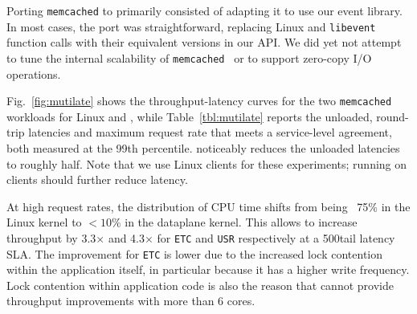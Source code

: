 

Porting \texttt{memcached} to \ix primarily consisted of adapting it
to use our event library. In most cases, the port was straightforward,
replacing Linux and \texttt{libevent} function calls with their
equivalent versions in our API. We did yet not attempt to tune the
internal scalability of \texttt{memcached}~\cite{DBLP:conf/nsdi/FanAK13}
or to support zero-copy I/O operations.


Fig.~\ref{fig:mutilate} shows the throughput-latency curves for the
two \texttt{memcached} workloads for Linux and \ix, while
Table~\ref{tbl:mutilate} reports the unloaded, round-trip latencies and
maximum request rate that meets a service-level agreement, both
measured at the 99th percentile.  \ix noticeably reduces the unloaded
latencies to roughly half.  Note that we use Linux clients for these
experiments; running \ix on clients should further reduce latency.

At high request rates, the distribution of CPU time shifts from being
\twiddle~75\% in the Linux kernel to $<10\%$ in the \ix dataplane kernel.
This allows \ix
to increase throughput by 3.3$\times$ and 4.3$\times$ for
\texttt{ETC} and \texttt{USR} respectively at a 500\microsecond tail
latency SLA.  The improvement for \texttt{ETC} is lower due to the
increased lock contention within the application itself, in particular
because it has a higher write frequency.  Lock contention
within application code is also the reason that \ix cannot provide
throughput improvements with more than 6 cores.


%

